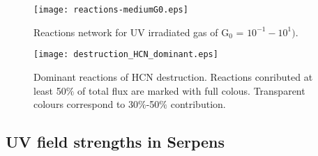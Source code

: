 \documentclass{aa}
\begin{document}
\begin{figure} 
\texttt{[image: reactions-mediumG0.eps]} 
\caption{Reactions network for UV irradiated gas of G$_0$ = $10^{-1} - 10^{1})$.}
\label{reactions_mediumG0} 
\end{figure}
\begin{figure} 
\texttt{[image: destruction\_HCN\_dominant.eps]} 
\caption{Dominant reactions
of HCN destruction. Reactions conributed at least 50$\%$ of total flux are marked with full colous.
Transparent colours correspond to 30$\%$-50$\%$ contribution.} 
\label{HCN_dest} 
\end{figure}
\subsection{UV field strengths in Serpens}
\end{document}
